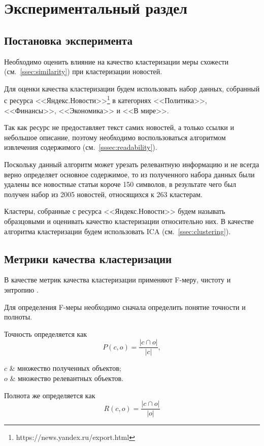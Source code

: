 \chapter{Экспериментальный раздел}
\section{Постановка эксперимента}
Необходимо оценить влияние на качество кластеризации меры схожести (см.~\ref{ssec:similarity}) при кластеризации новостей.

Для оценки качества кластеризации будем использовать набор данных, собранный с ресурса <<Яндекс.Новости>>\footnote{https://news.yandex.ru/export.html} в категориях <<Политика>>, <<Финансы>>, <<Экономика>> и <<В мире>>.

Так как ресурс не предоставляет текст самих новостей, а только ссылки и небольшое описание, поэтому необходимо воспользоваться алгоритмом извлечения содержимого (см.~\ref{sssec:readability}).

Поскольку данный алгоритм может урезать релевантную информацию и не всегда верно определяет основное содержимое, то из полученного набора данных были удалены все новостные статьи короче 150 символов, в результате чего был получен набор из 2005 новостей, относящихся к 263 кластерам.

Кластеры, собранные с ресурса <<Яндекс.Новости>> будем называть образцовыми и оценивать качество кластеризации относительно них. В качестве алгоритма кластеризации будем использовать ICA (см.~\ref{ssec:clustering}).

\section{Метрики качества кластеризации}
В качестве метрик качества кластеризации применяют F-меру, чистоту и энтропию \cite{andrews07}.

Для определения F-меры необходимо сначала определить понятие точности и полноты.

Точность определяется как
\begin{equation}
    P(c,o)=\frac{|c\cap o|}{|c|},
\end{equation}
\begin{conditions}
    $c$ & множество полученных объектов; \\
    $o$ & множество релевантных объектов. \\
\end{conditions}

Полнота же определяется как
\begin{equation}
    R(c,o)=\frac{|c\cap o|}{|o|}
\end{equation}

